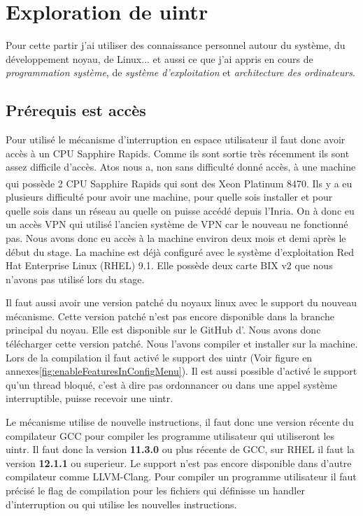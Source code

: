 \section{Exploration de uintr}
\label{sec:exploreUintr}

Pour cette partir j'ai utiliser des connaissance personnel autour du système, du développement noyau, de Linux... et aussi ce que j'ai appris en cours de \emph{programmation système}, de \emph{système d'exploitation} et \emph{architecture des ordinateurs}.

\subsection{Prérequis est accès}
\label{requirements}

Pour utilisé le mécanisme d'interruption en espace utilisateur il faut donc avoir accès à un CPU \intel{} Sapphire Rapids.
Comme ils sont sortie très récemment ils sont assez difficile d'accès.
Atos nous a, non sans difficulté donné accès, à une machine qui possède 2 CPU \intel{} Sapphire Rapids qui sont des \intel{} Xeon\textsuperscript{\tiny{\textregistered}} Platinum 8470.
Ils y a eu plusieurs difficulté pour avoir une machine, pour quelle sois installer et pour quelle sois dans un réseau au quelle on puisse accédé depuis l'Inria.
On à donc eu un accès VPN qui utilisé l'ancien système de VPN car le nouveau ne fonctionné pas.
Nous avons donc eu accès à la machine environ deux mois et demi après le début du stage.
La machine est déjà configuré avec le système d'exploitation Red Hat Enterprise Linux (RHEL) 9.1.
Elle possède deux carte BIX v2 que nous n'avons pas utilisé lors du stage.

Il faut aussi avoir une version patché du noyaux linux avec le support du nouveau mécanisme.
Cette version patché n'est pas encore disponible dans la branche principal du noyau.
Elle est disponible sur le GitHub d'\intel{}. Nous avons donc télécharger cette version patché.
Nous l'avons compiler et installer sur la machine.
Lors de la compilation il faut activé le support des uintr (Voir figure en annexes\ref{fig:enableFeaturesInConfigMenu}).
Il est aussi possible d'activé le support qu'un thread bloqué, c'est à dire pas ordonnancer ou dans une appel système interruptible, puisse recevoir une uintr.

Le mécanisme utilise de nouvelle instructions, il faut donc une version récente du compilateur GCC pour compiler les programme utilisateur qui utiliseront les uintr.
Il faut donc la version \textbf{11.3.0} ou plus récente de GCC, sur RHEL il faut la version \textbf{12.1.1} ou superieur.
Le support n'est pas encore disponible dans d'autre compilateur comme LLVM-Clang.
Pour compiler un programme utilisateur il faut précisé le flag de compilation  pour les fichiers qui définisse un handler d'interruption ou qui utilise les nouvelles instructions.

